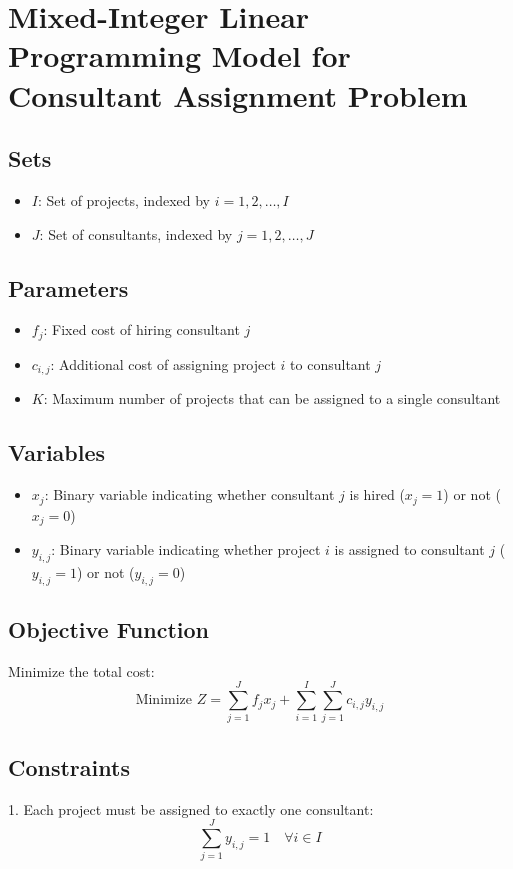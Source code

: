 \documentclass{article}
\begin{document}
\section*{Mixed-Integer Linear Programming Model for Consultant Assignment Problem}

\subsection*{Sets}
\begin{itemize}
    \item $I$: Set of projects, indexed by $i = 1, 2, \ldots, I$
    \item $J$: Set of consultants, indexed by $j = 1, 2, \ldots, J$
\end{itemize}

\subsection*{Parameters}
\begin{itemize}
    \item $f_j$: Fixed cost of hiring consultant $j$
    \item $c_{i,j}$: Additional cost of assigning project $i$ to consultant $j$
    \item $K$: Maximum number of projects that can be assigned to a single consultant
\end{itemize}

\subsection*{Variables}
\begin{itemize}
    \item $x_{j}$: Binary variable indicating whether consultant $j$ is hired ($x_{j} = 1$) or not ($x_{j} = 0$)
    \item $y_{i,j}$: Binary variable indicating whether project $i$ is assigned to consultant $j$ ($y_{i,j} = 1$) or not ($y_{i,j} = 0$)
\end{itemize}

\subsection*{Objective Function}
Minimize the total cost:
\[
\text{Minimize } Z = \sum_{j=1}^{J} f_j x_j + \sum_{i=1}^{I} \sum_{j=1}^{J} c_{i,j} y_{i,j}
\]

\subsection*{Constraints}
1. Each project must be assigned to exactly one consultant:
\[
\sum_{j=1}^{J} y_{i,j} = 1 \quad \forall i \in I
\]
\end{document}

